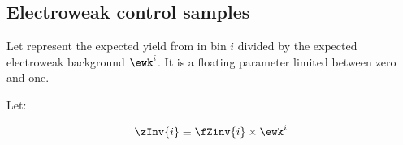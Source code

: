 %
%
%
%
%
%
%
%
%

\subsection{Electroweak control samples\label{sec:ewk}}

Let  represent the expected yield from \znunu in bin $i$
divided by the expected electroweak background $\ewk^{i}$.  It is
a floating parameter limited between zero and one.

Let:

\begin{equation}
  \zInv{i} \equiv \fZinv{i} \times \ewk^i 
  \label{eq:ZinvEwk}
\end{equation}

